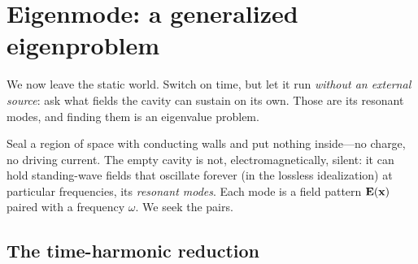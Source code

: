\section{Eigenmode: a generalized eigenproblem}
\label{sec:eigenmode}

We now leave the static world. Switch on time, but let it run \emph{without an
external source}: ask what fields the cavity can sustain on its own. Those are
its resonant modes, and finding them is an eigenvalue problem.

\begin{physicsbox}
Seal a region of space with conducting walls and put nothing inside---no charge,
no driving current. The empty cavity is not, electromagnetically, silent: it can
hold standing-wave fields that oscillate forever (in the lossless idealization)
at particular frequencies, its \emph{resonant modes}. Each mode is a field
pattern $\mathbf{E}(\mathbf{x})$ paired with a frequency $\omega$. We seek the pairs.
\end{physicsbox}

\subsection{The time-harmonic reduction}

